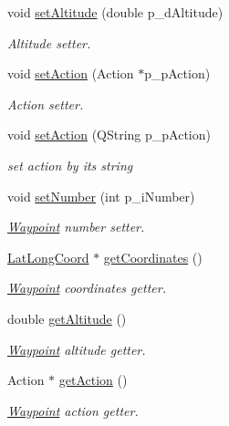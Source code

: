 \begin{DoxyCompactItemize}
void \hyperlink{class_waypoint_a13b172520dd12f1f18f094747827e838}{set\-Altitude} (double p\-\_\-d\-Altitude)
\begin{DoxyCompactList}\small\item\em Altitude setter. \end{DoxyCompactList}\item 
void \hyperlink{class_waypoint_ad83ec809508f8de50de2bf0ddc25d460}{set\-Action} (Action $\ast$p\-\_\-p\-Action)
\begin{DoxyCompactList}\small\item\em Action setter. \end{DoxyCompactList}\item 
void \hyperlink{class_waypoint_aa0ecbbfa0f0b771fd4b6e3e6ba02eb5f}{set\-Action} (Q\-String p\-\_\-p\-Action)
\begin{DoxyCompactList}\small\item\em set action by its string \end{DoxyCompactList}\item 
void \hyperlink{class_waypoint_a4225953851a50258e74d963871a32191}{set\-Number} (int p\-\_\-i\-Number)
\begin{DoxyCompactList}\small\item\em \hyperlink{class_waypoint}{Waypoint} number setter. \end{DoxyCompactList}\item 
\hyperlink{class_lat_long_coord}{Lat\-Long\-Coord} $\ast$ \hyperlink{class_waypoint_a8133eca6a34aff8e3d9b4c8c8d65ff4f}{get\-Coordinates} ()
\begin{DoxyCompactList}\small\item\em \hyperlink{class_waypoint}{Waypoint} coordinates getter. \end{DoxyCompactList}\item 
double \hyperlink{class_waypoint_a846ff8335c0831000818db064d26209b}{get\-Altitude} ()
\begin{DoxyCompactList}\small\item\em \hyperlink{class_waypoint}{Waypoint} altitude getter. \end{DoxyCompactList}\item 
Action $\ast$ \hyperlink{class_waypoint_a871b2842131770cff0a50cd0739b9ef3}{get\-Action} ()
\begin{DoxyCompactList}\small\item\em \hyperlink{class_waypoint}{Waypoint} action getter. \end{DoxyCompactList}\item 

\end{DoxyCompactItemize}
